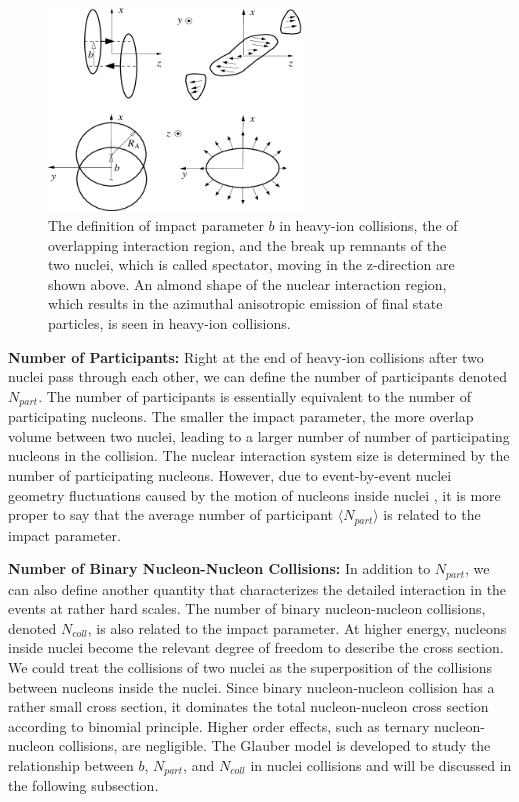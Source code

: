 \begin{figure}[hbtp]
\begin{center}
\includegraphics[width=0.60\textwidth]{Figures/Chapter1/IPHIColl.png}
\caption{The definition of impact parameter $b$ in heavy-ion collisions, the of overlapping interaction region, and the break up remnants of the two nuclei, which is called spectator, moving in the z-direction are shown above. An almond shape of the nuclear interaction region, which results in the azimuthal anisotropic emission of final state particles, is seen in heavy-ion collisions.}
\label{IPHIColl}
\end{center}
\end{figure} 


\textbf{Number of Participants:} Right at the end of heavy-ion collisions after two nuclei pass through each other, we can define the number of participants denoted $N_{part}$. The number of participants is essentially equivalent to the number of participating nucleons. The smaller the impact parameter, the more overlap volume between two nuclei, leading to a larger number of number of participating nucleons in the collision. The nuclear interaction system size is determined by the number of participating nucleons. However, due to event-by-event nuclei geometry fluctuations caused by the motion of nucleons inside nuclei \cite{GuntherV3}, it is more proper to say that the average number of participant $\langle N_{part} \rangle$ is related to the impact parameter.

\textbf{Number of Binary Nucleon-Nucleon Collisions:} In addition to $N_{part}$, we can also define another quantity that characterizes the detailed interaction in the events at rather hard scales. The number of binary nucleon-nucleon collisions, denoted $N_{coll}$, is also related to the impact parameter. At higher energy, nucleons inside nuclei become the relevant degree of freedom to describe the cross section. We could treat the collisions of two nuclei as the superposition of the collisions between nucleons inside the nuclei. Since binary nucleon-nucleon collision has a rather small cross section, it dominates the total nucleon-nucleon cross section according to binomial principle. Higher order effects, such as ternary nucleon-nucleon collisions, are negligible. The Glauber model \cite{CentPlot} is developed to study the relationship between $b$, $N_{part}$, and $N_{coll}$ in nuclei collisions and will be discussed in the following subsection.


